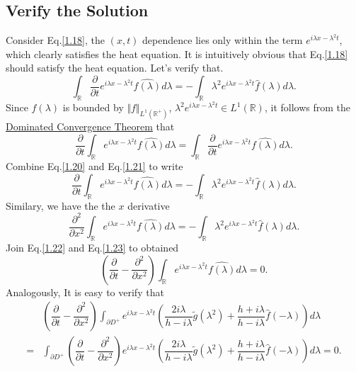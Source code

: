 \documentclass[12pt]{article}
\numberwithin{equation}{section}
\begin{document}
\subsection{Verify the Solution}
Consider Eq.\eqref{1.18}, the $(x,t)$ dependence lies only within the term $e^{i\lambda x-\lambda^2 t}$, which clearly satisfies the heat equation. It is intuitively obvious that Eq.\eqref{1.18} should satisfy the heat equation. Let's verify that.
\begin{equation}\label{1.20}
    \int_{\mathbb{R}} \dfrac{\partial}{\partial t} e^{i\lambda x-\lambda^2 t} \hat{f(\lambda)}d\lambda=-\int_{\mathbb{R}} \lambda^2 e^{i\lambda x-\lambda^2 t}\hat{f}(\lambda)d\lambda.
\end{equation}
Since $\hat{f}(\lambda)$ is bounded by $\Vert f\Vert_{L^1({\mathbb{R^+}})}$, $\lambda^2e^{i\lambda x-\lambda^2 t}\in L^1(\mathbb{R})$, it follows from the \href{https://w.wiki/9asL}{Dominated Convergence Theorem} that
\begin{equation}\label{1.21}
    \dfrac{\partial}{\partial t} \int_{\mathbb{R}}e^{i\lambda x-\lambda^2 t} \hat{f(\lambda)}d\lambda=\int_{\mathbb{R}} \dfrac{\partial}{\partial t} e^{i\lambda x-\lambda^2 t} \hat{f(\lambda)}d\lambda.
\end{equation}
Combine Eq.\eqref{1.20} and Eq.\eqref{1.21} to write
\begin{equation}\label{1.22}
    \dfrac{\partial}{\partial t} \int_{\mathbb{R}}e^{i\lambda x-\lambda^2 t} \hat{f(\lambda)}d\lambda=-\int_{\mathbb{R}} \lambda^2 e^{i\lambda x-\lambda^2 t}\hat{f}(\lambda)d\lambda.
\end{equation}
Similary, we have the the $x$ derivative
\begin{equation}\label{1.23}
    \dfrac{\partial^2}{\partial x^2} \int_{\mathbb{R}}e^{i\lambda x-\lambda^2 t} \hat{f(\lambda)}d\lambda=-\int_{\mathbb{R}} \lambda^2 e^{i\lambda x-\lambda^2 t}\hat{f}(\lambda)d\lambda.
\end{equation}
Join Eq.\eqref{1.22} and Eq.\eqref{1.23} to obtained
\begin{equation}\label{1.24}
    \left(\dfrac{\partial}{\partial t}-\dfrac{\partial^2}{\partial x^2}\right)\int_{\mathbb{R}}e^{i\lambda x-\lambda^2 t} \hat{f(\lambda)}d\lambda=0.
\end{equation}
Analogously, It is easy to verify that 
\begin{equation}\label{1.25}
    \begin{split}
    &\left(\dfrac{\partial}{\partial t}-\dfrac{\partial^2}{\partial x^2}\right)\int_{\partial D^+} e^{i\lambda x-\lambda^2 t}\left(\dfrac{2i\lambda}{h-i\lambda}\tilde{g}(\lambda^2)+\dfrac{h+i\lambda}{h-i\lambda}\hat{f}(-\lambda)\right) d\lambda\\
    =&\int_{\partial D^+} \left(\dfrac{\partial}{\partial t}-\dfrac{\partial^2}{\partial x^2}\right)e^{i\lambda x-\lambda^2 t}\left(\dfrac{2i\lambda}{h-i\lambda}\tilde{g}(\lambda^2)+\dfrac{h+i\lambda}{h-i\lambda}\hat{f}(-\lambda)\right) d\lambda=0.
    \end{split}
\end{equation}
\end{document}
